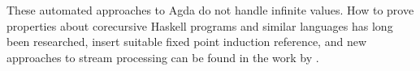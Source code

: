 These automated approaches to Agda do not handle infinite values. How
to prove properties about corecursive Haskell programs and similar
languages has long been researched, insert suitable fixed point
induction reference, and new approaches to stream processing can be
found in the work by \cite{streams}.
